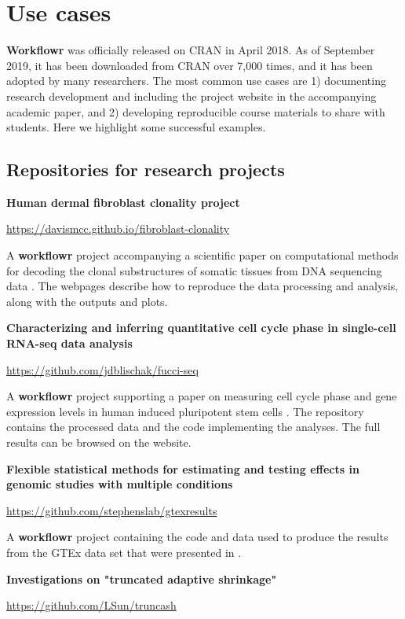 \documentclass[9pt,a4paper]{extarticle}
\begin{document}
\section*{Use cases}

 \textbf{Workflowr} was officially released on CRAN in April 2018. As of September
2019, it has been downloaded from CRAN over 7,000 times, and it has been
adopted by many researchers. The most common use cases are 1)
documenting research development and including the project website in
the accompanying academic paper, and 2) developing reproducible course
materials to share with students. Here we highlight some successful
examples.

\subsection*{Repositories for research projects}

\textbf{Human dermal fibroblast clonality project}

\url{https://davismcc.github.io/fibroblast-clonality}

A \textbf{workflowr} project accompanying a scientific paper on computational
methods for decoding the clonal substructures of somatic tissues from
DNA sequencing data \cite{McCarthy2018}. The webpages describe how to
reproduce the data processing and analysis, along with the outputs and
plots.

\textbf{Characterizing and inferring quantitative cell cycle phase in
single-cell RNA-seq data analysis}

\url{https://github.com/jdblischak/fucci-seq}

A \textbf{workflowr} project supporting a paper on measuring cell cycle phase and
gene expression levels in human induced pluripotent stem cells
\cite{Hsiao2019}. The repository contains the processed data and the
code implementing the analyses. The full results can be browsed on the
website.

\textbf{Flexible statistical methods for estimating and testing effects
in genomic studies with multiple conditions}

\url{https://github.com/stephenslab/gtexresults}

A \textbf{workflowr} project containing the code and data used to produce the
results from the GTEx data set that were presented in \citet{Urbut2019}.

\textbf{Investigations on "truncated adaptive shrinkage"}

\url{https://github.com/LSun/truncash}
\end{document}
